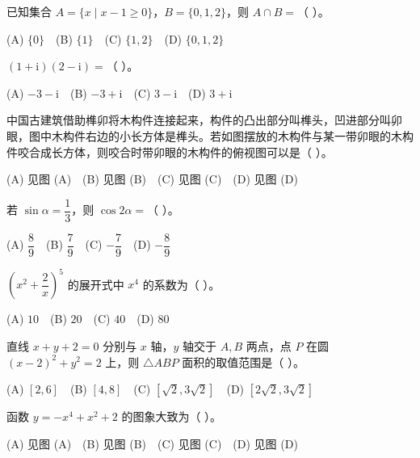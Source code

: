 \begin{question}
已知集合 $A = \{x \mid x - 1 \geqslant 0\}$，$B = \{0, 1, 2\}$，则 $A \cap B =$（ ）。

(A) $\{0\}$　(B) $\{1\}$　(C) $\{1, 2\}$　(D) $\{0, 1, 2\}$

\end{question}
\begin{question}
$(1 + \mathrm i)(2 - \mathrm i) =$（ ）。

(A) $-3 - \mathrm i$　(B) $-3 + \mathrm i$　(C) $3 - \mathrm i$　(D) $3 + \mathrm i$

\Needspace{0.4\textheight}
\end{question}
\begin{question}
中国古建筑借助榫卯将木构件连接起来，构件的凸出部分叫榫头，凹进部分叫卯眼，图中木构件右边的小长方体是榫头。若如图摆放的木构件与某一带卯眼的木构件咬合成长方体，则咬合时带卯眼的木构件的俯视图可以是（ ）。
\nopagebreak[4]
\begin{center}\end{center}
\nopagebreak[4]
(A) 见图 (A)　(B) 见图 (B)　(C) 见图 (C)　(D) 见图 (D)

\end{question}
\begin{question}
若 $\sin\alpha = \dfrac13$，则 $\cos 2\alpha =$（ ）。

(A) $\dfrac89$　(B) $\dfrac79$　(C) $-\dfrac79$　(D) $-\dfrac89$

\end{question}
\begin{question}
$\left(x^2 + \dfrac2x\right)^5$ 的展开式中 $x^4$ 的系数为（ ）。

(A) $10$　(B) $20$　(C) $40$　(D) $80$

\end{question}
\begin{question}
直线 $x + y + 2 = 0$ 分别与 $x$ 轴，$y$ 轴交于 $A, B$ 两点，点 $P$ 在圆 $(x - 2)^2 + y^2 = 2$ 上，则 $\triangle ABP$ 面积的取值范围是（ ）。

(A) $[2, 6]$　(B) $[4, 8]$　(C) $[\sqrt2, 3\sqrt2]$　(D) $[2\sqrt2, 3\sqrt2]$

\Needspace{0.4\textheight}
\end{question}
\begin{question}
函数 $y = -x^4 + x^2 + 2$ 的图象大致为（ ）。
\nopagebreak[4]
\begin{center}\end{center}
\nopagebreak[4]
(A) 见图 (A)　(B) 见图 (B)　(C) 见图 (C)　(D) 见图 (D)

\end{question}
